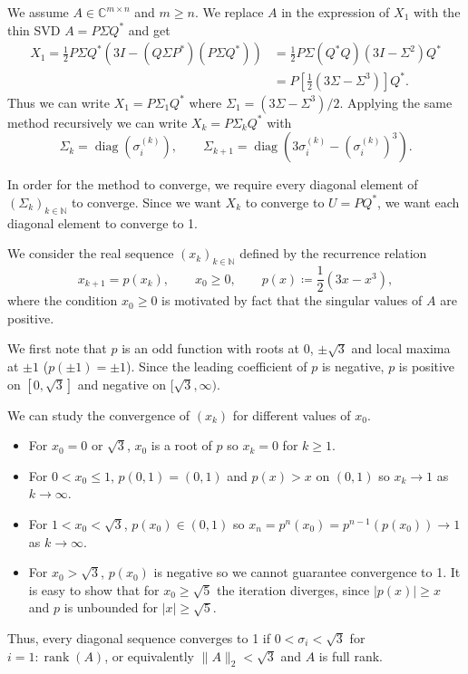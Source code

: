 \documentclass[10pt, A4paper]{article}
\newcommand{\mxn}{m \times n}
\DeclareMathOperator{\diag}{diag}
\DeclareMathOperator{\rank}{rank}
\begin{document}
We assume $A \in \mathbb{C}^{\mxn}$ and $m\geq n$. We replace $A$ in 
the expression of $X_1$ with the thin SVD $A = P \Sigma Q^*$ and get
\begin{align*}
	X_1 = \frac{1}{2}P \Sigma Q^*
	\left(3I - (Q\Sigma P^*) (P \Sigma Q^*)\right)
	   &= \frac{1}{2} P \Sigma (Q^* Q) (3I - \Sigma^2) Q^* \\
	   &= P \left[ \frac{1}{2} (3\Sigma - \Sigma^3) \right] Q^*.
\end{align*}
Thus we can write $X_1 = P \Sigma_1 Q^*$ where $\Sigma_1 = (3\Sigma - 
\Sigma^3)/2$.
Applying the same method recursively we can write $X_k = P\Sigma_k Q^*$ 
with
$$
\Sigma_k = \diag(\sigma_i^{(k)}), \qquad \Sigma_{k+1} = \diag
(3\sigma_i^{(k)} - (\sigma_i^{(k)})^3).
$$

In order for the method to converge, we require every diagonal element 
of $(\Sigma_k)_{k\in\mathbb{N}}$ to converge. Since we want $X_k$ to 
converge to $U = PQ^*$, we want each diagonal element to converge to 1. 

We consider the real sequence $(x_k)_{k \in \mathbb{N}}$ defined by the 
recurrence relation
$$
	x_{k+1} = p(x_k), \qquad x_0 \geq 0, \qquad p(x) \coloneqq 
	\frac{1}{2} (3x - x^3),
$$
where the condition $x_0 \geq 0$ is motivated by fact that the 
singular values of $A$ are positive.

We first note that $p$ is an odd function with roots at 0, $\pm\sqrt{3}$
and local maxima at $\pm1$ ($p(\pm1) = \pm1$).
Since the leading coefficient of $p$ is negative, $p$ is positive on 
$[0,\sqrt{3}]$ and negative on $[\sqrt{3}, \infty)$.

We can study the convergence of $(x_k)$ for different values of $x_0$.
\begin{itemize}
	\item For $x_0 = 0$ or $\sqrt{3}$, $x_0$ is a root of $p$ so
	$x_k = 0$ for $k \geq 1$.
	\item For $0 < x_0 \leq 1$, $p(0,1) = (0, 1)$ and $p(x) > x$  on 
	$(0, 1)$ so $x_k \to 1$ as $k \to \infty$.
	\item For $1 < x_0 < \sqrt{3}$, $p(x_0) \in (0,1)$ so $x_n = 
	p^n(x_0) = p^{n-1}(p(x_0)) \to 1$ as $k \to \infty$.
	\item For $x_0 > \sqrt{3}$, $p(x_0)$ is negative so we cannot 
	guarantee convergence to 1. It is easy to show that for $x_0 \geq 
	\sqrt{5}$ the iteration diverges, since $|p(x)| \geq x$ and $p$ is 
	unbounded for $|x| \geq \sqrt{5}$.
\end{itemize}
Thus, every diagonal sequence converges to 1 if $0 < \sigma_i < 
\sqrt{3}$ for {$i = 1:\rank(A)$}, or equivalently $\|A\|_2 < \sqrt{3}$ 
and $A$ is full rank.
\end{document}

